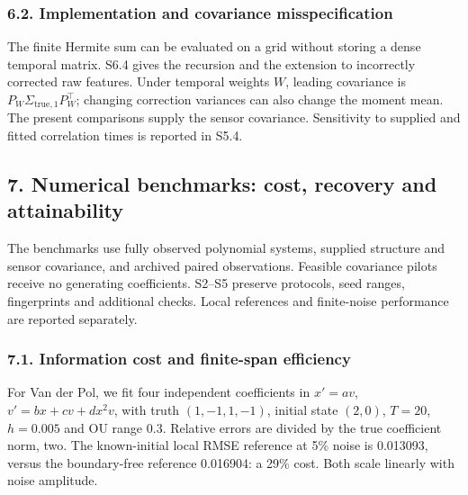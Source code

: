 \documentclass[
  american,
  11pt,
]{article}
\begin{document}
\subsubsection{6.2. Implementation and covariance
misspecification}\label{implementation-and-covariance-misspecification}

The finite Hermite sum can be evaluated on a grid without storing a
dense temporal matrix. S6.4 gives the recursion and the extension to
incorrectly corrected raw features. Under temporal weights \(W\),
leading covariance is \(P_W\Sigma_{\mathrm{true},1}P_W^\top\); changing
correction variances can also change the moment mean. The present
comparisons supply the sensor covariance. Sensitivity to supplied and
fitted correlation times is reported in S5.4.

\subsection{7. Numerical benchmarks: cost, recovery and
attainability}\label{numerical-benchmarks-cost-recovery-and-attainability}

The benchmarks use fully observed polynomial systems, supplied structure
and sensor covariance, and archived paired observations. Feasible
covariance pilots receive no generating coefficients. S2--S5 preserve
protocols, seed ranges, fingerprints and additional checks. Local
references and finite-noise performance are reported separately.

\subsubsection{7.1. Information cost and finite-span
efficiency}\label{information-cost-and-finite-span-efficiency}

For Van der Pol, we fit four independent coefficients in \(x'=av\),
\(v'=bx+cv+dx^2v\), with truth \((1,-1,1,-1)\), initial state \((2,0)\),
\(T=20\), \(h=0.005\) and OU range 0.3. Relative errors are divided by
the true coefficient norm, two. The known-initial local RMSE reference
at 5\% noise is 0.013093, versus the boundary-free reference 0.016904: a
29\% cost. Both scale linearly with noise amplitude.
\end{document}
